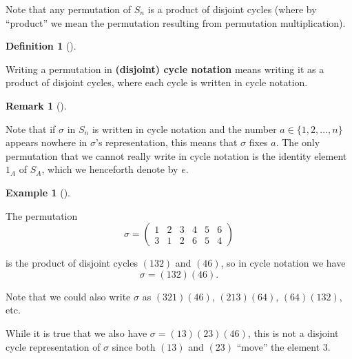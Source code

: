 \documentclass[10pt,]{book}
\newcommand{\terminology}[1]{\textbf{#1}}
\theoremstyle{plain}
\theoremstyle{definition}
\newtheorem{definition}[theorem]{Definition}
\theoremstyle{definition}
\newtheorem{remark}[theorem]{Remark}
\theoremstyle{definition}
\newtheorem{example}[theorem]{Example}
\theoremstyle{definition}
\numberwithin{equation}{section}
\newcommand{\amp}{ & }
\begin{document}
    Note that any permutation of \(S_n\) is a product of disjoint cycles (where by ``product'' we mean the permutation resulting from permutation multiplication).
\begin{definition}[{}]\label{definition-47}

        Writing a permutation in \terminology{(disjoint)
        cycle notation} means writing it as a product of disjoint
        cycles, where each cycle is written in cycle notation.
\end{definition}
\begin{remark}[]\label{remark-29}

      Note that if \(\sigma\) in \(S_n\) is
      written in cycle notation and the number \(a\in \{1,2,\ldots, n\}\)
      appears nowhere in \(\sigma\)'s representation, this means that
      \(\sigma\) fixes \(a\). The only permutation that we cannot really write
      in cycle notation is the identity element \(1_A\) of \(S_A\), which we
      henceforth denote by \(e\).
\end{remark}
\begin{example}[]\label{example-55}

        The permutation
\begin{equation*}

          \sigma =\begin{pmatrix}1\amp 2\amp 3\amp 4\amp 5\amp 6\\ 3\amp 1\amp 2\amp 6\amp 5\amp 4
          \end{pmatrix}
        
\end{equation*}

        is the product of disjoint cycles
        \((132)\) and \((46)\), so in cycle notation we have
\begin{equation*}

          \sigma=(132)(46).
        
\end{equation*}

\par

        Note that we could also write \(\sigma\) as \((321)(46)\), \((213)(64)\), \((64)(132)\), etc.
\par

        While it is true that we also have \(\sigma=(13)(23)(46)\), this is not a disjoint cycle representation of \(\sigma\) since both \((13)\) and \((23)\) ``move'' the element \(3\).
\end{example}
\end{document}
